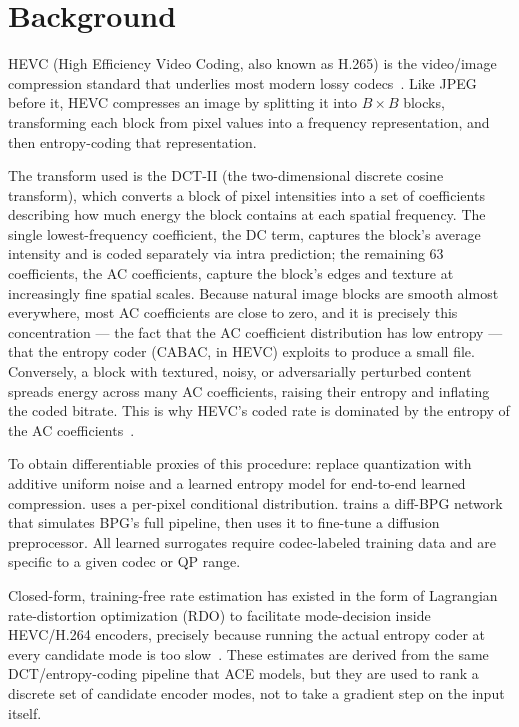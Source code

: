 \section{Background}
\label{sec:background}

HEVC (High Efficiency Video Coding, also known as H.265) is the video/image compression standard that underlies most modern lossy codecs~\citep{sullivan2012hevc}. 
Like JPEG before it, HEVC compresses an image by splitting it into $B\times B$ blocks, transforming each block from pixel values into a frequency representation, and then entropy-coding that representation.

The transform used is the DCT-II (the two-dimensional discrete cosine transform), which converts a block of pixel intensities into a set of coefficients describing how much energy the block contains at each spatial frequency. 
The single lowest-frequency coefficient, the DC term, captures the block's average intensity and is coded separately via intra prediction; the remaining 63 coefficients, the AC coefficients, capture the block's edges and texture at increasingly fine spatial scales.
Because natural image blocks are smooth almost everywhere, most AC coefficients are close to zero, and it is precisely this concentration --- the fact that the AC coefficient distribution has low entropy --- that the entropy coder (CABAC, in HEVC) exploits to produce a small file. 
Conversely, a block with textured, noisy, or adversarially perturbed content spreads energy across many AC coefficients, raising their entropy and inflating the coded bitrate. 
This is why HEVC's coded rate is dominated by the entropy of the AC coefficients~\citep{sullivan2012hevc}.

To obtain differentiable proxies of this procedure: \citet{balle2018variational} replace quantization with additive uniform noise and a learned entropy model for end-to-end learned compression.
\citet{mentzer2018conditional} uses a per-pixel conditional distribution.
\citet{guo2026generative} trains a diff-BPG network that simulates BPG's full pipeline, then uses it to fine-tune a diffusion preprocessor.
All learned surrogates require codec-labeled training data and are specific to a given codec or QP range.

Closed-form, training-free rate estimation has existed in the form of Lagrangian rate-distortion optimization (RDO) to facilitate mode-decision inside HEVC/H.264 encoders, precisely because running the actual entropy coder at every candidate mode is too slow~\citep{sullivan1998rdo}. 
These estimates are derived from the same DCT/entropy-coding pipeline that ACE models, but they are used to rank a discrete set of candidate encoder modes, not to take a gradient step on the input itself.


